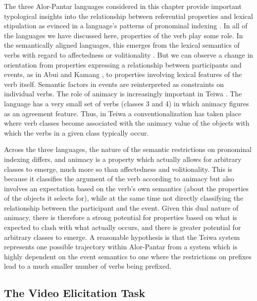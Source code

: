 The three Alor-Pantar languages considered in this chapter provide important typological insights into the relationship between referential properties  and lexical stipulation  as evinced in a language's patterns of pronominal indexing . In all of the languages we have discussed here, properties of the verb play some role. In the semantically aligned  languages, this emerges from the lexical semantics of verbs with regard to affectedness  or volitionality . But we can observe a change in orientation from properties expressing a relationship between participants and events, as in Abui  and Kamang , to properties involving lexical features of the verb itself. Semantic factors in events are reinterpreted as constraints on individual verbs. The role of animacy  is increasingly important in Teiwa . The language has a very small set of verbs (classes 3 and 4) in which animacy figures as an agreement feature. Thus, in Teiwa  a conventionalization  has taken place where verb classes become associated with the animacy value of the objects with which the verbs in a given class typically occur.

Across the three languages, the nature of the semantic restrictions on pronominal indexing differs, and animacy  is a property which actually allows for arbitrary classes  to emerge, much more so than affectedness and volitionality. This is because it classifies the argument of the verb according to animacy but also involves an expectation based on the verb's own semantics (about the properties of the objects it selects for), while at the same time not directly classifying the relationship between the participant and the event. Given this dual nature of animacy, there is therefore a strong potential for properties based on what is expected to clash with what actually occurs, and there is greater potential for arbitrary classes to emerge. A reasonable hypothesis is that the Teiwa  system represents one possible trajectory within Alor-Pantar from a system which is highly dependent on the event semantics to one where the restrictions on prefixes lead to a much smaller number of verbs being prefixed. 

\startappendix
\subsection{The Video Elicitation Task} 
